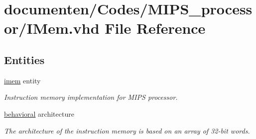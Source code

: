 \hypertarget{_i_mem_8vhd}{\section{documenten/\-Codes/\-M\-I\-P\-S\-\_\-processor/\-I\-Mem.vhd File Reference}
\label{_i_mem_8vhd}
}
\subsection*{Entities}
\begin{DoxyCompactItemize}
\item 
\hyperlink{classimem}{imem} entity
\begin{DoxyCompactList}\small\item\em Instruction memory implementation for M\-I\-P\-S processor. \end{DoxyCompactList}\item 
\hyperlink{classimem_1_1behavioral}{behavioral} architecture
\begin{DoxyCompactList}\small\item\em The architecture of the instruction memory is based on an array of 32-\/bit words. \end{DoxyCompactList}\end{DoxyCompactItemize}
